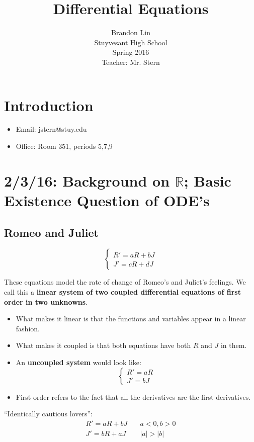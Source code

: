 \documentclass[12pt]{article}
\begin{document}
\title{Differential Equations}
\author{Brandon Lin\\Stuyvesant High School\\Spring 2016\\Teacher: Mr. Stern}
\maketitle
\newpage

\tableofcontents 

\newpage
\section*{Introduction}

\begin{itemize}
\item Email: jstern@stuy.edu
\item Office: Room 351, periods 5,7,9
\end{itemize}

\section{2/3/16: Background on $\mathbb{R}$; Basic Existence Question of ODE's}
\subsection{Romeo and Juliet}
\[
\begin{cases}
R' = aR + bJ \\
J' = cR + dJ 
\end{cases}
\]

These equations model the rate of change of Romeo's and Juliet's feelings. We call this a \textbf{linear system of two coupled differential equations of first order in two unknowns}. 
\begin{itemize}
\item What makes it linear is that the functions and variables appear in a linear fashion. 
\item What makes it coupled is that both equations have both $R$ and $J$ in them.
\item An \textbf{uncoupled system} would look like:
\[
\begin{cases}
R' = aR \\
J' = bJ
\end{cases}
\] 
\item First-order refers to the fact that all the derivatives are the first derivatives.
\end{itemize}
``Identically cautious lovers'':
\[
\begin{aligned} 
R' = aR + bJ &\quad a<0, b>0 \\
J' = bR + aJ &\quad |a| > |b|
\end{aligned}
\]
\end{document}

